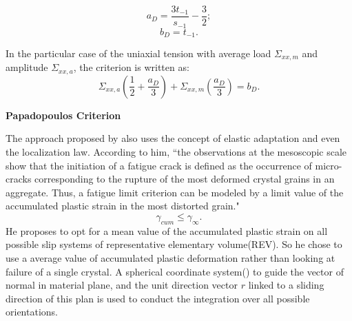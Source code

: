 $$a_D=\frac{3t_{-1}}{s_{-1}}-\frac{3}{2};$$  $$b_D=t_{-1}.$$

In the particular case of the uniaxial tension with average load $\Sigma_{xx,m}$ and amplitude $\Sigma_{xx,a}$, the criterion is written as:
$$\Sigma_{xx,a}\left(\dfrac{1}{2}+\dfrac{a_D}{3} \right)+\Sigma_{xx,m}\left(\dfrac{a_D}{3} \right) =b_D.$$

\textbf{Papadopoulos Criterion}

The approach proposed by \cite{papadopoulos1993fatigue} also uses the concept of elastic adaptation and even the localization law. According to him, ``the observations at the mesoscopic scale show that the initiation of a fatigue crack is
defined as the occurrence of micro-cracks corresponding to the rupture of the most deformed crystal grains in an
aggregate. Thus, a fatigue limit criterion can be modeled by a limit value of the accumulated plastic strain in the
most distorted grain."
$$\gamma_{cum}\leqslant\gamma_\infty.$$
He proposes to opt for a mean value of the accumulated plastic strain on all possible slip systems of representative elementary volume(REV). So he chose to use a average value  of accumulated plastic deformation rather than looking at failure of a single crystal. A spherical coordinate system() to guide the vector of normal in material plane, and the unit direction vector $r$ linked to a sliding direction of this plan is used to conduct the integration over all possible orientations.

